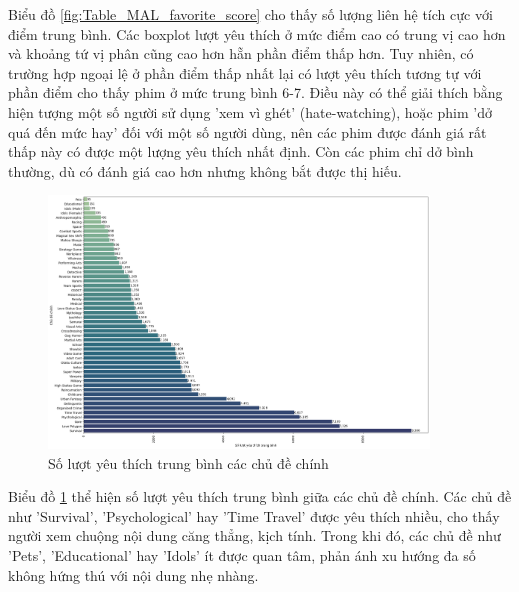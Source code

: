     \FloatBarrier

    Biểu đồ \ref{fig:Table_MAL_favorite_score} cho thấy số lượng liên hệ tích cực với điểm trung bình. Các boxplot lượt yêu thích ở mức điểm cao có trung vị cao hơn và khoảng tứ vị phân cũng cao hơn hẵn phần điểm thấp hơn. Tuy nhiên, có trường hợp ngoại lệ ở phần điểm thấp nhất lại có lượt yêu thích tương tự với phần điểm cho thấy phim ở mức trung bình 6-7. Điều này có thể giải thích bằng hiện tượng một số người sử dụng 'xem vì ghét' (hate-watching), hoặc phim 'dở quá đến mức hay' đối với một số người dùng, nên các phim được đánh giá rất thấp này có được một lượng yêu thích nhất định. Còn các phim chỉ dở bình thường, dù có đánh giá cao hơn nhưng không bắt được thị hiếu.

     \begin{figure}[htp]
        \centering
        \includegraphics[width=0.90\textwidth]{images/Table_MAL_themes_fav.png}
        \caption{Số lượt yêu thích trung bình các chủ đề chính}
        \label{fig:Table_MAL_themes_fav}
    \end{figure}

    \FloatBarrier

    Biểu đồ \ref{fig:Table_MAL_themes_fav} thể hiện số lượt yêu thích trung bình giữa các chủ đề chính. Các chủ đề như 'Survival', 'Psychological' hay 'Time Travel' được yêu thích nhiều, cho thấy người xem chuộng nội dung căng thẳng, kịch tính. Trong khi đó, các chủ đề như 'Pets', 'Educational' hay 'Idols' ít được quan tâm, phản ánh xu hướng đa số không hứng thú với nội dung nhẹ nhàng.

